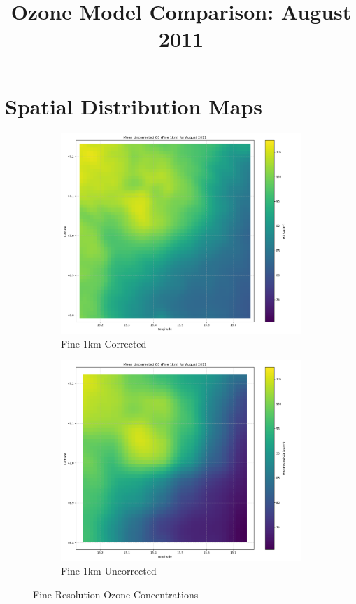 \documentclass[12pt,a4paper]{article}
\title{Ozone Model Comparison: August 2011}
\author{}
\date{}
\begin{document}
\maketitle

\section{Spatial Distribution Maps}

\begin{figure}[H]
    \centering
    \begin{subfigure}[b]{0.48\textwidth}
        \centering
        \includegraphics[width=\textwidth]{o3_mean_corrected_fine_august_2011.png}
        \caption{Fine 1km Corrected}
    \end{subfigure}
    \hfill
    \begin{subfigure}[b]{0.48\textwidth}
        \centering
        \includegraphics[width=\textwidth]{o3_mean_uncorrected_fine_august_2011.png}
        \caption{Fine 1km Uncorrected}
    \end{subfigure}
    \caption{Fine Resolution Ozone Concentrations}
\end{figure}
\end{document}
